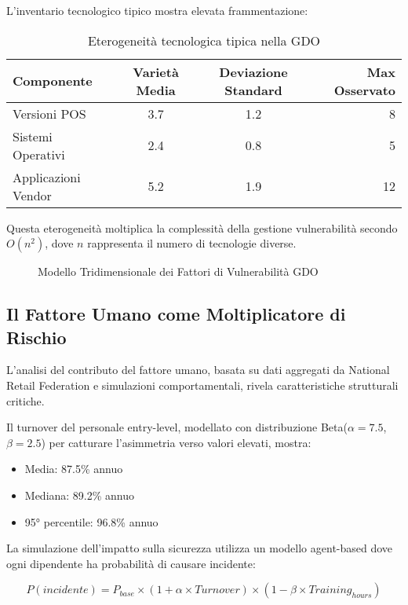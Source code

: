 L'inventario tecnologico tipico mostra elevata frammentazione:

\begin{table}[H]
\centering
\begin{tabular}{lccr}
\toprule
Componente & Varietà Media & Deviazione Standard & Max Osservato \\
\midrule
Versioni POS & 3.7 & 1.2 & 8 \\
Sistemi Operativi & 2.4 & 0.8 & 5 \\
Applicazioni Vendor & 5.2 & 1.9 & 12 \\
\bottomrule
\end{tabular}
\caption{Eterogeneità tecnologica tipica nella GDO}
\end{table}

Questa eterogeneità moltiplica la complessità della gestione vulnerabilità secondo $O(n^2)$, dove $n$ rappresenta il numero di tecnologie diverse.

\begin{figure}[H]
\centering
{}
\caption{Modello Tridimensionale dei Fattori di Vulnerabilità GDO}
\end{figure}

\subsection{Il Fattore Umano come Moltiplicatore di Rischio}

L'analisi del contributo del fattore umano, basata su dati aggregati da National Retail Federation e simulazioni comportamentali, rivela caratteristiche strutturali critiche.

Il turnover del personale entry-level, modellato con distribuzione Beta($\alpha=7.5$, $\beta=2.5$) per catturare l'asimmetria verso valori elevati, mostra:
\begin{itemize}
\item Media: 87.5\% annuo
\item Mediana: 89.2\% annuo
\item 95° percentile: 96.8\% annuo
\end{itemize}

La simulazione dell'impatto sulla sicurezza utilizza un modello agent-based dove ogni dipendente ha probabilità di causare incidente:

\begin{equation}
P(incidente) = P_{base} \times (1 + \alpha \times Turnover) \times (1 - \beta \times Training_{hours})
\end{equation}

